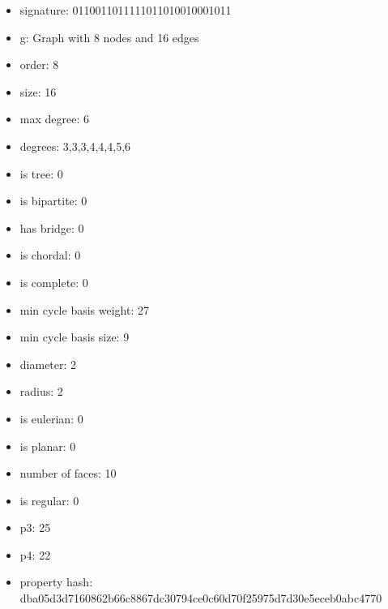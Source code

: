 \begin{itemize}
\item signature: 0110011011111011010010001011
\item g: Graph with 8 nodes and 16 edges
\item order: 8
\item size: 16
\item max degree: 6
\item degrees: 3,3,3,4,4,4,5,6
\item is tree: 0
\item is bipartite: 0
\item has bridge: 0
\item is chordal: 0
\item is complete: 0
\item min cycle basis weight: 27
\item min cycle basis size: 9
\item diameter: 2
\item radius: 2
\item is eulerian: 0
\item is planar: 0
\item number of faces: 10
\item is regular: 0
\item p3: 25
\item p4: 22
\item property hash: dba05d3d7160862b66c8867dc30794ce0c60d70f25975d7d30e5eceb0abc4770
\end{itemize}
\newpage
\begin{figure}
\end{figure}
